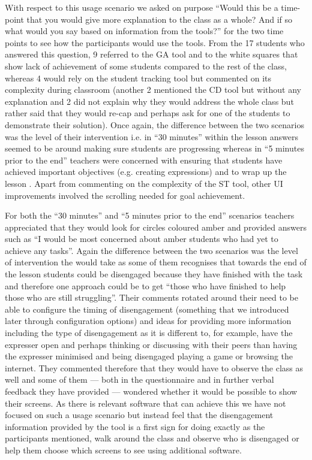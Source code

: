 {{{With respect to this usage scenario we asked on purpose “Would this be
a time-point that you would give more explanation to the class as a
whole? And if so what would you say based on information from the
tools?” for the two time points to see how the participants would use
the tools. From the 17 students who answered this question, 9 referred
to the GA tool and to the white squares that show lack of achievement
of some students compared to the rest of the class, whereas 4 would
rely on the student tracking tool but commented on its complexity
during classroom (another 2 mentioned the CD tool but without any
explanation and 2 did not explain why they would address the whole
class but rather said that they would re-cap and perhaps ask for one
of the students to demonstrate their solution).  Once again, the
difference between the two scenarios was the level of their
intervention i.e. in “30 minutes” within the lesson answers seemed to
be around making sure students are progressing whereas in “5 minutes
prior to the end” teachers were concerned with ensuring that students
have achieved important objectives (e.g. creating expressions) and to
wrap up the lesson . Apart from commenting on the complexity of the ST
tool, other UI improvements involved the scrolling needed for goal
achievement.

For both the “30 minutes” and “5 minutes prior to the end” scenarios
teachers appreciated that they would look for circles coloured amber
and provided answers such as “I would be most concerned about amber
students who had yet to achieve any tasks”. Again the difference
between the two scenarios was the level of intervention the would take
as some of them recognises that towards the end of the lesson students
could be disengaged because they have finished with the task and
therefore one approach could be to get “those who have finished to
help those who are still struggling”. Their comments rotated around
their need to be able to configure the timing of disengagement
(something that we introduced later through configuration options) and
ideas for providing more information including the type of
disengagement as it is different to, for example, have the expresser
open and perhaps thinking or discussing with their peers than having
the expresser minimised and being disengaged playing a game or
browsing the internet. They commented therefore that they would have
to observe the class as well and some of them --- both in the
questionnaire and in further verbal feedback they have provided ---
wondered whether it would be possible to show their screens. As there
is relevant software that can achieve this we have not focused on such
a usage scenario but instead feel that the disengagement information
provided by the tool is a first sign for doing exactly as the
participants mentioned, walk around the class and observe who is
disengaged or help them choose which screens to see using additional
software. 

}}}
